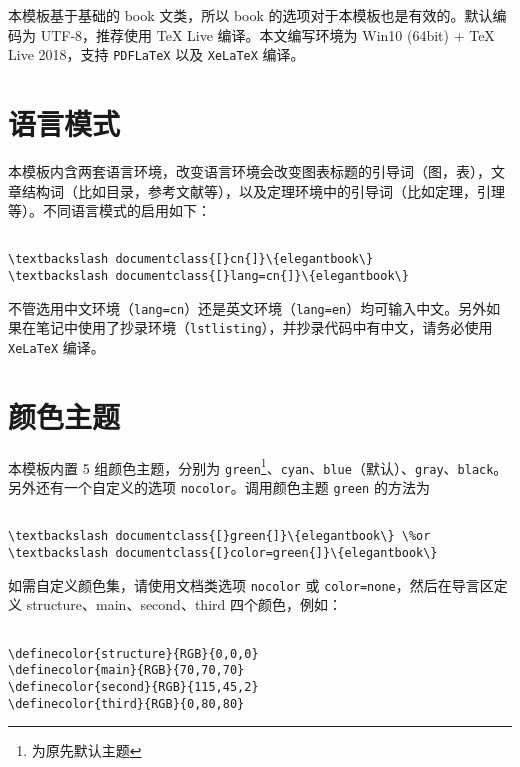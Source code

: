 \documentclass[cn,11pt,fancy,hide]{elegantbook}
\let\rmarkdownfootnote\footnote%
\def\footnote{\protect\rmarkdownfootnote}
\begin{document}
本模板基于基础的 book 文类，所以 book 的选项对于本模板也是有效的。默认编码为 UTF-8，推荐使用 TeX Live 编译。本文编写环境为 Win10 (64bit) + TeX Live 2018，支持 \texttt{PDFLaTeX} 以及 \texttt{XeLaTeX} 编译。

\hypertarget{section-1}{%
\section{语言模式}\label{section-1}}

本模板内含两套语言环境，改变语言环境会改变图表标题的引导词（图，表），文章结构词（比如目录，参考文献等），以及定理环境中的引导词（比如定理，引理等）。不同语言模式的启用如下：

\begin{lstlisting}

\textbackslash documentclass{[}cn{]}\{elegantbook\}
\textbackslash documentclass{[}lang=cn{]}\{elegantbook\}

\end{lstlisting}

\begin{remark}

不管选用中文环境（\texttt{lang=cn}）还是英文环境（\texttt{lang=en}）均可输入中文。另外如果在笔记中使用了抄录环境（\texttt{lstlisting}），并抄录代码中有中文，请务必使用 \texttt{XeLaTeX} 编译。

\end{remark}

\hypertarget{section-2}{%
\section{颜色主题}\label{section-2}}

本模板内置 5 组颜色主题，分别为 \texttt{green}\footnote{为原先默认主题}、\texttt{cyan}、\texttt{blue}（默认）、\texttt{gray}、\texttt{black}。另外还有一个自定义的选项 \texttt{nocolor}。调用颜色主题 \texttt{green} 的方法为

\begin{lstlisting}

\textbackslash documentclass{[}green{]}\{elegantbook\} \%or
\textbackslash documentclass{[}color=green{]}\{elegantbook\}

\end{lstlisting}

如需自定义颜色集，请使用文档类选项 \texttt{nocolor} 或 \texttt{color=none}，然后在导言区定义 structure、main、second、third 四个颜色，例如：

\begin{lstlisting}

\definecolor{structure}{RGB}{0,0,0}
\definecolor{main}{RGB}{70,70,70}
\definecolor{second}{RGB}{115,45,2}
\definecolor{third}{RGB}{0,80,80}

\end{lstlisting}
\end{document}
